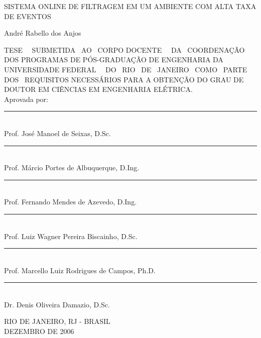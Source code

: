 \begin{titlepage}
\begin{center}
{ SISTEMA ONLINE DE FILTRAGEM EM UM AMBIENTE COM ALTA TAXA DE EVENTOS }

\vspace*{1.0cm}
{André Rabello dos Anjos}
\end{center}
\vspace*{1.0cm}

{ \noindent 
TESE~~ SUBMETIDA~ AO~ CORPO DOCENTE~~ DA~ COORDENAÇÃO~ DOS
PROGRAMAS DE PÓS-GRADUAÇÃO DE ENGENHARIA DA \mbox{UNIVERSIDADE} FEDERAL~~ DO~
RIO~ DE~ JANEIRO~ COMO~ PARTE~ DOS~ REQUISITOS \mbox{NECESSÁRIOS} PARA A
OBTENÇÃO DO GRAU DE DOUTOR EM CIÊNCIAS EM ENGENHARIA ELÉTRICA. }  \\

\noindent Aprovada por:
\vspace{1.0cm} %

\begin{flushright}
\parbox{10cm}
{
\begin{center}

\rule{10cm}{.02cm} \\
Prof. José Manoel de Seixas, D.Sc.
\vspace{.20in}

\rule{10cm}{.02cm} \\
Prof. Márcio Portes de Albuquerque, D.Ing.
\vspace{.20in}

\rule{10cm}{.02cm} \\
Prof. Fernando Mendes de Azevedo, D.Ing.
\vspace{.20in}

\rule{10cm}{.02cm} \\
Prof. Luiz Wagner Pereira Biscainho, D.Sc.
\vspace{.20in}

\rule{10cm}{.02cm} \\
Prof. Marcello Luiz Rodrigues de Campos, Ph.D.
\vspace{.20in}

\rule{10cm}{.02cm} \\
Dr. Denis Oliveira Damazio, D.Sc.
\vspace{.20in}

\end{center}
}
\end{flushright}
\vspace{-.5cm}

\vfill
\begin{center}
RIO DE JANEIRO, RJ - BRASIL \\
DEZEMBRO DE 2006
\end{center}

\end{titlepage}
